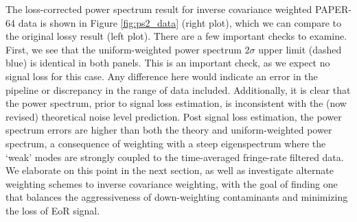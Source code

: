 \documentclass[preprint2,numberedappendix,tighten]{aastex6}  %
\begin{document}

The loss-corrected power spectrum result for inverse covariance weighted PAPER-64 data is shown in Figure \ref{fig:ps2_data} (right plot), which we can compare to the original lossy result (left plot). There are a few important checks to examine. First, we see that the uniform-weighted power spectrum $2\sigma$ upper limit (dashed blue) is identical in both panels. This is an important check, as we expect no signal loss for this case. Any difference here would indicate an error in the pipeline or discrepancy in the range of data included. Additionally, it is clear that the power spectrum, prior to signal loss estimation, is inconsistent with the (now revised) theoretical noise level prediction. 
Post signal loss estimation, the power spectrum errors are higher than both the theory and uniform-weighted power spectrum, a consequence of weighting with a steep eigenspectrum where the `weak' modes are strongly coupled to the time-averaged fringe-rate filtered data. We elaborate on this point in the next section, as well as investigate alternate 
weighting schemes to inverse covariance weighting, with the goal of finding one that balances the aggressiveness of down-weighting contaminants and minimizing the loss of EoR signal. 
\end{document}
